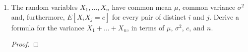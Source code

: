 \documentclass[paper=usletter, fontsize=12pt]{article}
\begin{document}
\begin{enumerate}
\begin{enumerate}
\begin{proof}
            \end{proof}

            \item Calculate $f_{X \mid B}(x)$.
            \begin{proof}

                Since $f_{X \mid B}(x) = \frac{f(X \cap B)}{f(B)}$,
                \begin{align*}
                    f(X \cap B) & = \int_{x}^{1-x}2\diff{y} \\
                    & = 2 - 4x \\
                    f(B) & = \int_{0}^{1/2}\int_{x}^{1-x}2\diff{x}\diff{y} \\
                    & = \frac{1}{2} \\
                    f_{X \mid B}(x) & = \frac{2 - 4x}{\frac{1}{2}} \\
                    & = 4 - 8x, \ 0 \le x \le \frac{1}{2} \qedhere
                \end{align*}
                \endgroup

            \end{proof}

            \item Calculate $E[XY]$.
            \begin{proof}

                \begin{align*}
                    E[XY] & = \int_{0}^{1}\int_{0}^{1-y}2xy\diff{y}\diff{x}\\
                    & = \frac{1}{12} \qedhere
                \end{align*}
                \endgroup

            \end{proof}

            \item Calculate the PDF of $Y/X$.
            \begin{proof}
            \end{proof}

        \end{enumerate}

        \item The random variables $X_1,\ldots,X_n$ have common mean $\mu$,
        common variance $\sigma^2$ and, furthermore, $E[X_iX_j=c]$ for every
        pair of distinct $i$ and $j$. Derive a formula for the variance
        $X_1+\ldots+X_n$, in terms of $\mu$, $\sigma^2$, $c$, and $n$.
        \begin{proof}


\end{proof}
\end{enumerate}
\end{document}
